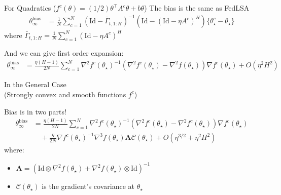 \documentclass[aspectratio=169,14pt]{beamer}
\begin{document}
  \begin{frame}{\Large For Quadratics ($f^c(\theta) = (1/2)\theta^\top A^c \theta + b \theta$)}
    The bias is the same as FedLSA
    \begin{align*}
      \theta_\infty^{\text{bias}}
      & =
        \frac{1}{N}
        \sum_{c=1}^N
        (\text{Id} - \bar{\Gamma}_{t,1:H})^{-1} 
        (\text{Id} - (\text{Id}- \eta A^c)^H)\{ \theta_\star^c - \theta_\star \}
    \end{align*}
    where $\bar{\Gamma}_{t,1:H} = \tfrac{1}{N} \sum_{c=1}^N (\text{Id}- \eta A^c)^H$

    \pause
    
    And we can give first order expansion:
    \begin{align*}
      \!\!\!\!\theta_\infty^{\text{bias}}
      & \!=\!
        \frac{\eta(H -1)}{2 N}
        \sum_{c=1}^N 
        \nabla^2 f^c(\theta_\star)^{-1} 
        (\nabla^2 f^c(\theta_\star) \!-\!  \nabla^2 f(\theta_\star)) \nabla f^c(\theta_\star)
        \!+\! O(\eta^2 H^2)
    \end{align*}
    
  \end{frame}

  \begin{frame}{In the General Case\\[-0.5em]
      \small (Strongly convex and smooth functions $f^c$)}

    Bias is in two parts!
    \begin{align*}
      \theta_\infty^{\text{bias}}
      & =
        \frac{\eta(H -1)}{2 N}
        \sum_{c=1}^N 
        \nabla^2 f^c(\theta_\star)^{-1} 
        (\nabla^2 f^c(\theta_\star) -  \nabla^2 f^c(\theta_\star)) \nabla f^c(\theta_\star)
      \\
      & \quad
        + \frac{\eta}{2 N} \nabla f^c(\theta_\star)^{-1} \nabla^3 f(\theta_\star) \textbf{A} \mathcal{C}(\theta_\star)
        + O(\eta^{3/2} + \eta^2 H^2)
    \end{align*}
    \small 
    where:

    \vspace{-1em}
    
    \begin{itemize}
    \item $\textbf{A} = (\text{Id} \otimes \nabla^2 f(\theta_\star) + \nabla^2 f(\theta_\star) \otimes \text{Id})^{-1}$
    \item  $\mathcal{C}(\theta_\star)$ is the gradient's covariance at $\theta_\star$
    \end{itemize}
    
    
  \end{frame}
\end{document}
